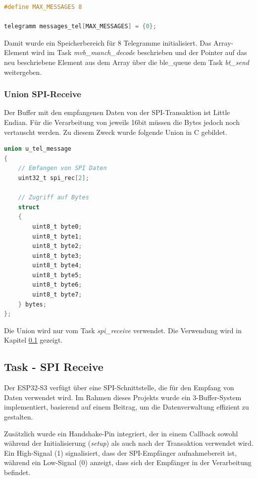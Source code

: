 \begin{lstlisting}[language=C]
#define MAX_MESSAGES 8

telegramm messages_tel[MAX_MESSAGES] = {0};
\end{lstlisting}

Damit wurde ein Speicherbereich für 8 Telegramme initialisiert. Das Array-Element wird im Task \textit{mvb\_manch\_decode} beschrieben und der Pointer auf das neu beschriebene Element aus dem Array über die ble\_queue dem Task \textit{bt\_send} weitergeben. 


\subsubsection{Union SPI-Receive}
\label{subsub:UnionSPI}

Der Buffer mit den empfangenen Daten von der SPI-Transaktion ist Little Endian. Für die Verarbeitung von jeweils 16bit müssen die Bytes jedoch noch vertauscht werden. Zu diesem Zweck wurde folgende Union in C gebildet.

\begin{lstlisting}[language=C]
union u_tel_message
{
    // Emfangen von SPI Daten
    uint32_t spi_rec[2];

    // Zugriff auf Bytes
    struct 
    {
        uint8_t byte0;
        uint8_t byte1;
        uint8_t byte2;
        uint8_t byte3;
        uint8_t byte4;
        uint8_t byte5;
        uint8_t byte6;
        uint8_t byte7;
    } bytes;
};
\end{lstlisting}

Die Union wird nur vom Task \textit{spi\_receive} verwendet. Die Verwendung wird in Kapitel \ref{sub:TaskSPIReceive} gezeigt. 


\subsection{Task - SPI Receive}
\label{sub:TaskSPIReceive}
Der ESP32-S3 verfügt über eine SPI-Schnittstelle, die für den Empfang von Daten verwendet wird. Im Rahmen dieses Projekts wurde ein 3-Buffer-System implementiert, basierend auf einem Beitrag, um die Datenverwaltung effizient zu gestalten. 

Zusätzlich wurde ein Handshake-Pin integriert, der in einem Callback sowohl während der Initialisierung (\textit{setup}) als auch nach der Transaktion verwendet wird. Ein High-Signal (1) signalisiert, dass der SPI-Empfänger aufnahmebereit ist, während ein Low-Signal (0) anzeigt, dass sich der Empfänger in der Verarbeitung befindet.

